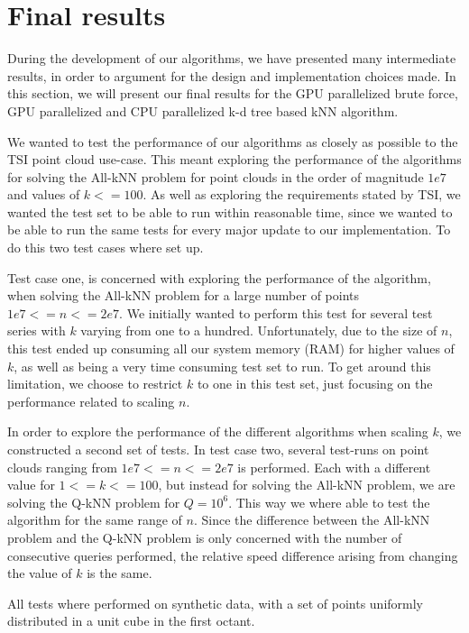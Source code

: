 \section{Final results} %
\label{sec:final_results}
During the development of our algorithms, we have presented many intermediate results, in order to argument for the design and implementation choices made. In this section, we will present our final results for the GPU parallelized brute force, GPU parallelized and CPU parallelized k-d tree based kNN algorithm.

We wanted to test the performance of our algorithms as closely as possible to the TSI point cloud use-case. This meant exploring the performance of the algorithms for solving the All-kNN problem for point clouds in the order of magnitude $1e7$ and values of $k<=100$. As well as exploring the requirements stated by TSI, we wanted the test set to be able to run within reasonable time, since we wanted to be able to run the same tests for every major update to our implementation. To do this two test cases where set up.

Test case one, is concerned with exploring the performance of the algorithm, when solving the All-kNN problem for a large number of points $1e7<=n<=2e7$. We initially wanted to perform this test for several test series with $k$ varying from one to a hundred. Unfortunately, due to the size of $n$, this test ended up consuming all our system memory (RAM) for higher values of $k$, as well as being a very time consuming test set to run. To get around this limitation, we choose to restrict $k$ to one in this test set, just focusing on the performance related to scaling $n$.

In order to explore the performance of the different algorithms when scaling $k$, we constructed a second set of tests. In test case two, several test-runs on point clouds ranging from $1e7<=n<=2e7$ is performed. Each with a different value for $1<=k<=100$, but instead for solving the All-kNN problem, we are solving the Q-kNN problem for $Q=10^6$. This way we where able to test the algorithm for the same range of $n$. Since the difference between the All-kNN problem and the Q-kNN problem is only concerned with the number of consecutive queries performed, the relative speed difference arising from changing the value of $k$ is the same.

All tests where performed on synthetic data, with a set of points uniformly distributed in a unit cube in the first octant.

